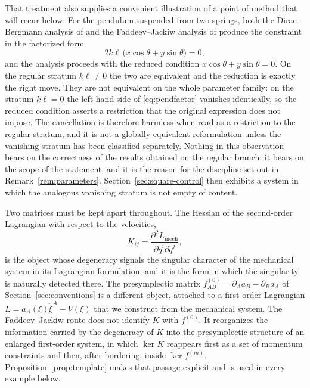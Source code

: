 \documentclass[12pt]{article}
\theoremstyle{plain}
\theoremstyle{definition}
\theoremstyle{remark}
\newcommand{\pd}[1]{\partial_{#1}}
\begin{document}
	That treatment also supplies a convenient illustration of a point of method
	that will recur below. For the pendulum suspended from two springs, both the
	Dirac--Bergmann analysis of \cite{Brown2023} and the Faddeev--Jackiw analysis
	of \cite{PaulinFuentes2024} produce the constraint in the factorized form
	\begin{equation}
		2k\ell\,\bigl(x\cos\theta+y\sin\theta\bigr)=0,
		\label{eq:pendfactor}
	\end{equation}
	and the analysis proceeds with the reduced condition
	$x\cos\theta+y\sin\theta=0$. On the regular stratum $k\ell\neq0$ the two are
	equivalent and the reduction is exactly the right move. They are not
	equivalent on the whole parameter family: on the stratum $k\ell=0$ the
	left-hand side of \eqref{eq:pendfactor} vanishes identically, so the reduced
	condition asserts a restriction that the original expression does not impose.
	The cancellation is therefore harmless when read as a restriction to the
	regular stratum, and it is not a globally equivalent reformulation unless the
	vanishing stratum has been classified separately. Nothing in this observation
	bears on the correctness of the results obtained on the regular branch; it
	bears on the scope of the statement, and it is the reason for the discipline
	set out in Remark~\ref{rem:parameters}. Section~\ref{sec:square-control} then
	exhibits a system in which the analogous vanishing stratum is not empty of
	content.
	
	Two matrices must be kept apart throughout. The Hessian of the second-order
	Lagrangian with respect to the velocities,
	\begin{equation}
		K_{ij}=\frac{\partial^{2}L_{\mathrm{mech}}}{\partial\dot q^{i}\partial\dot q^{j}},
		\label{eq:Khessian}
	\end{equation}
	is the object whose degeneracy signals the singular character of the mechanical
	system in its Lagrangian formulation, and it is the form in which the
	singularity is naturally detected there. The presymplectic matrix
	$f^{(0)}_{AB}=\pd{A}a_{B}-\pd{B}a_{A}$ of Section~\ref{sec:conventions} is a
	different object, attached to a first-order Lagrangian
	$L=a_{A}(\xi)\dot\xi^{A}-V(\xi)$ that we construct from the mechanical system.
	The Faddeev--Jackiw route does not identify $K$ with $f^{(0)}$. It reorganizes
	the information carried by the degeneracy of $K$ into the presymplectic
	structure of an enlarged first-order system, in which $\ker K$ reappears first
	as a set of momentum constraints and then, after bordering, inside
	$\ker f^{(m)}$. Proposition~\ref{prop:template} makes that passage explicit and
	is used in every example below.
	
\end{document}
